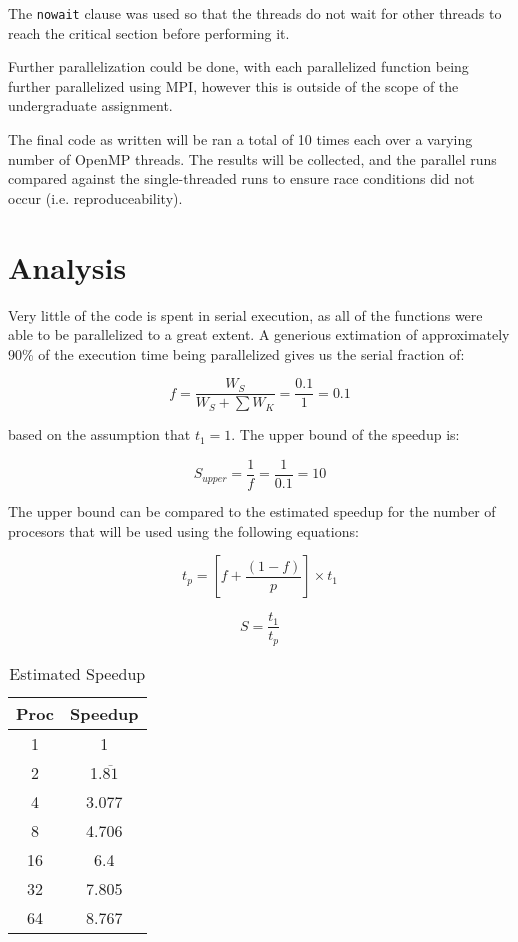 \documentclass{article}
\begin{document}
  The \verb|nowait| clause was used so that the threads do not wait for other
  threads to reach the critical section before performing it.

  Further parallelization could be done, with each parallelized function being
  further parallelized using MPI, however this is outside of the scope of the
  undergraduate assignment.

  The final code as written will be ran a total of 10 times each over a varying
  number of OpenMP threads. The results will be collected, and the parallel
  runs compared against the single-threaded runs to ensure race conditions did
  not occur (i.e. reproduceability).

  \section{Analysis}

  Very little of the code is spent in serial execution, as all of the functions
  were able to be parallelized to a great extent. A generious extimation of
  approximately 90\% of the execution time being parallelized gives us the
  serial fraction of:

  \[ f = \frac{W_S}{W_S + \sum W_K} = \frac{0.1}{1} = 0.1 \]

  based on the assumption that \( t_1 = 1 \). The upper bound of the speedup 
  is:

  \[ S_{upper} = \frac{1}{f} = \frac{1}{0.1} = 10 \]

  The upper bound can be compared to the estimated speedup for the number of
  procesors that will be used using the following equations:

  \[ t_p = \left[ f + \frac{\left( 1 - f \right)}{p} \right] \times t_1 \]

  \[ S = \frac{t_1}{t_p} \]

  \begin{table}[H]
    \centering

    \begin{tabular}{|c|c|}
      \hline
      Proc & Speedup \\
      \hline
      1  & 1                  \\
      2  & 1.$\overline{81}$  \\
      4  & 3.077              \\
      8  & 4.706              \\
      16 & 6.4                \\
      32 & 7.805              \\
      64 & 8.767              \\
      \hline
    \end{tabular}
    \caption{Estimated Speedup}
    \label{tab:estspeeduptab}
  \end{table}
\end{document}
